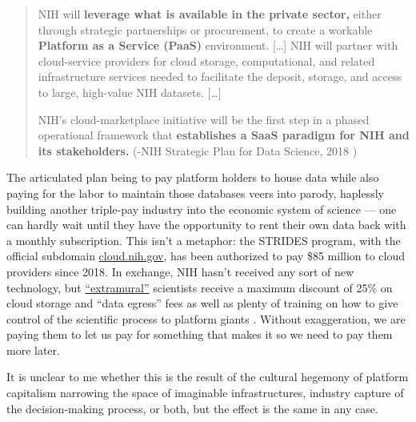 \begin{quote}
NIH will \textbf{leverage what is available in the private sector,}
either through strategic partnerships or procurement, to create a
workable \textbf{Platform as a Service (PaaS)} environment. {[}\ldots{]}
NIH will partner with cloud-service providers for cloud storage,
computational, and related infrastructure services needed to facilitate
the deposit, storage, and access to large, high-value NIH datasets.
{[}\ldots{]}

NIH's cloud-marketplace initiative will be the first step in a phased
operational framework that \textbf{establishes a SaaS paradigm for NIH
and its stakeholders.} (-NIH Strategic Plan for Data Science, 2018 \citep{NIHStrategicPlan2018} )
\end{quote}

The articulated plan being to pay platform holders to house data while
also paying for the labor to maintain those databases veers into parody,
haplessly building another triple-pay industry \citep{buranyiStaggeringlyProfitableBusiness2017}  into the economic system
of science --- one can hardly wait until they have the opportunity to
rent their own data back with a monthly subscription. This isn't a
metaphor: the STRIDES program, with the official subdomain
\href{https://web.archive.org/web/20210729131920/https://cloud.nih.gov/}{cloud.nih.gov},
has been authorized to pay \$85 million to cloud providers since 2018.
In exchange, NIH hasn't received any sort of new technology, but
\href{https://web.archive.org/web/20211006003547/https://cloud.nih.gov/enrollment/account-type/}{``extramural''}
scientists receive a maximum discount of 25\% on cloud storage and
``data egress'' fees as well as plenty of training on how to give
control of the scientific process to platform giants \citep{reillyNIHSTRIDESInitiative2021} . Without
exaggeration, we are paying them to let us pay for something that makes
it so we need to pay them more later.

It is unclear to me whether this is the result of the cultural hegemony
of platform capitalism narrowing the space of imaginable
infrastructures, industry capture of the decision-making process, or
both, but the effect is the same in any case.

